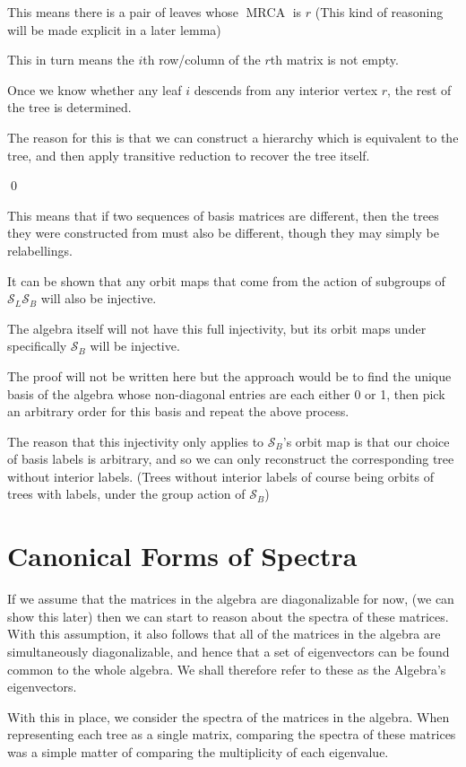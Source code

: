 \documentclass[10pt,a4paper]{report}
\DeclareMathOperator{\MRCA}{MRCA}
\newcommand{\Sym}{\mathcal{S}}
\begin{document}
This means there is a pair of leaves whose $\MRCA$ is $r$ (This kind of reasoning will be made explicit in a later lemma)

This in turn means the $i$th row/column of the $r$th matrix is not empty.

Once we know whether any leaf $i$ descends from any interior vertex $r$, the rest of the tree is determined.

The reason for this is that we can construct a hierarchy which is equivalent to the tree, and then apply transitive reduction to recover the tree itself.

\qed

This means that if two sequences of basis matrices are different, then the trees they were constructed from must also be different, though they may simply be relabellings.

It can be shown that any orbit maps that come from the action of subgroups of $\Sym_L\Sym_B$ will also be injective.

The algebra itself will not have this full injectivity, but its orbit maps under specifically $\Sym_B$ will be injective.

The proof will not be written here but the approach would be to find the unique basis of the algebra whose non-diagonal entries are each either 0 or 1, then pick an arbitrary order for this basis and repeat the above process.

The reason that this injectivity only applies to $\Sym_B$'s orbit map is that our choice of basis labels is arbitrary, and so we can only reconstruct the corresponding tree without interior labels. (Trees without interior labels of course being orbits of trees with labels, under the group action of $\Sym_B$)

\section{Canonical Forms of Spectra}

If we assume that the matrices in the algebra are diagonalizable for now, (we
can show this later) then we can start to reason about the spectra of these
matrices.
With this assumption, it also follows that all of the matrices in the
algebra are simultaneously diagonalizable, and hence that a set of eigenvectors
can be found common to the whole algebra.
We shall therefore refer to these as the Algebra's eigenvectors.

With this in place, we consider the spectra of the matrices in the algebra.
When representing each tree as a single matrix, comparing the spectra of these
matrices was a simple matter of comparing the multiplicity of each eigenvalue.
\end{document}
